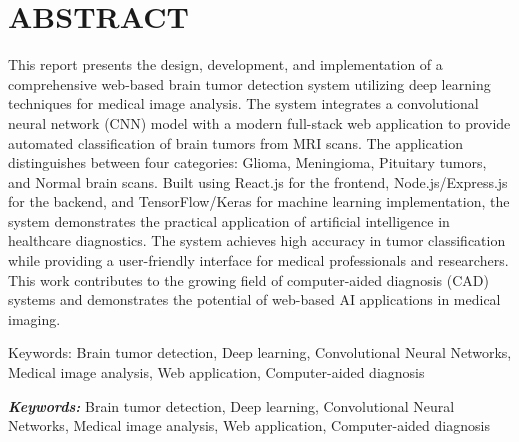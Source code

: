 \section*{\Large\centering \textbf{ABSTRACT}}
This report presents the design, development, and implementation of a comprehensive web-based brain tumor detection system utilizing deep learning techniques for medical image analysis. The system integrates a convolutional neural network (CNN) model with a modern full-stack web application to provide automated classification of brain tumors from MRI scans. The application distinguishes between four categories: Glioma, Meningioma, Pituitary tumors, and Normal brain scans. Built using React.js for the frontend, Node.js/Express.js for the backend, and TensorFlow/Keras for machine learning implementation, the system demonstrates the practical application of artificial intelligence in healthcare diagnostics. The system achieves high accuracy in tumor classification while providing a user-friendly interface for medical professionals and researchers. This work contributes to the growing field of computer-aided diagnosis (CAD) systems and demonstrates the potential of web-based AI applications in medical imaging.

Keywords: Brain tumor detection, Deep learning, Convolutional Neural Networks, Medical image analysis, Web application, Computer-aided diagnosis

\hfill \vspace{1cm} \break 
\small
\noindent \textbf{\textit{Keywords:}} Brain tumor detection, Deep learning, Convolutional Neural Networks, Medical image analysis, Web application, Computer-aided diagnosis
\newpage